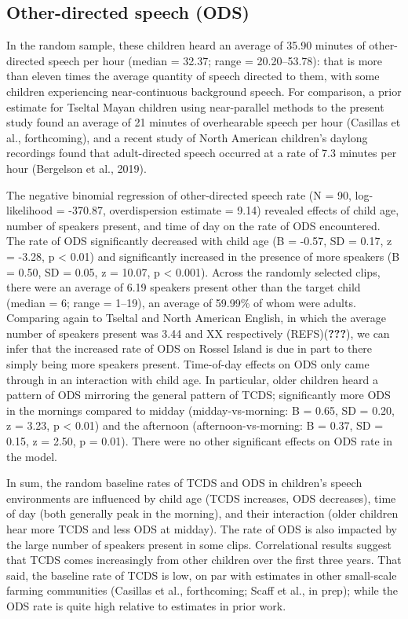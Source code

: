 \documentclass[,man,floatsintext]{apa6}
\begin{document}
\subsection{Other-directed speech
(ODS)}\label{other-directed-speech-ods}

In the random sample, these children heard an average of 35.90 minutes
of other-directed speech per hour (median = 32.37; range =
20.20--53.78): that is more than eleven times the average quantity of
speech directed to them, with some children experiencing near-continuous
background speech. For comparison, a prior estimate for Tseltal Mayan
children using near-parallel methods to the present study found an
average of 21 minutes of overhearable speech per hour (Casillas et al.,
forthcoming), and a recent study of North American children's daylong
recordings found that adult-directed speech occurred at a rate of 7.3
minutes per hour (Bergelson et al., 2019).

The negative binomial regression of other-directed speech rate (N = 90,
log-likelihood = -370.87, overdispersion estimate = 9.14) revealed
effects of child age, number of speakers present, and time of day on the
rate of ODS encountered. The rate of ODS significantly decreased with
child age (B = -0.57, SD = 0.17, z = -3.28, p \textless{} 0.01) and
significantly increased in the presence of more speakers (B = 0.50, SD =
0.05, z = 10.07, p \textless{} 0.001). Across the randomly selected
clips, there were an average of 6.19 speakers present other than the
target child (median = 6; range = 1--19), an average of 59.99\% of whom
were adults. Comparing again to Tseltal and North American English, in
which the average number of speakers present was 3.44 and XX
respectively (REFS)({\textbf{???}}), we can infer that the increased
rate of ODS on Rossel Island is due in part to there simply being more
speakers present. Time-of-day effects on ODS only came through in an
interaction with child age. In particular, older children heard a
pattern of ODS mirroring the general pattern of TCDS; significantly more
ODS in the mornings compared to midday (midday-vs-morning: B = 0.65, SD
= 0.20, z = 3.23, p \textless{} 0.01) and the afternoon
(afternoon-vs-morning: B = 0.37, SD = 0.15, z = 2.50, p = 0.01). There
were no other significant effects on ODS rate in the model.

In sum, the random baseline rates of TCDS and ODS in children's speech
environments are influenced by child age (TCDS increases, ODS
decreases), time of day (both generally peak in the morning), and their
interaction (older children hear more TCDS and less ODS at midday). The
rate of ODS is also impacted by the large number of speakers present in
some clips. Correlational results suggest that TCDS comes increasingly
from other children over the first three years. That said, the baseline
rate of TCDS is low, on par with estimates in other small-scale farming
communities (Casillas et al., forthcoming; Scaff et al., in prep); while
the ODS rate is quite high relative to estimates in prior work.
\end{document}
